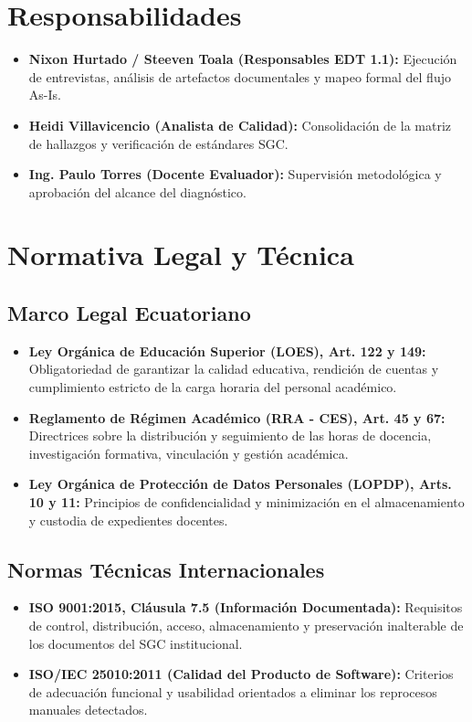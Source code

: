 \documentclass[12pt,a4paper]{article}
\begin{document}
\section{Responsabilidades}
\begin{itemize}[leftmargin=1.5em, itemsep=2pt]
    \item \textbf{Nixon Hurtado / Steeven Toala (Responsables EDT 1.1):} Ejecución de entrevistas, análisis de artefactos documentales y mapeo formal del flujo As-Is.
    \item \textbf{Heidi Villavicencio (Analista de Calidad):} Consolidación de la matriz de hallazgos y verificación de estándares SGC.
    \item \textbf{Ing. Paulo Torres (Docente Evaluador):} Supervisión metodológica y aprobación del alcance del diagnóstico.
\end{itemize}

\section{Normativa Legal y Técnica}
\subsection{Marco Legal Ecuatoriano}
\begin{itemize}[leftmargin=1.5em, itemsep=2pt]
    \item \textbf{Ley Orgánica de Educación Superior (LOES), Art. 122 y 149:} Obligatoriedad de garantizar la calidad educativa, rendición de cuentas y cumplimiento estricto de la carga horaria del personal académico.
    \item \textbf{Reglamento de Régimen Académico (RRA - CES), Art. 45 y 67:} Directrices sobre la distribución y seguimiento de las horas de docencia, investigación formativa, vinculación y gestión académica.
    \item \textbf{Ley Orgánica de Protección de Datos Personales (LOPDP), Arts. 10 y 11:} Principios de confidencialidad y minimización en el almacenamiento y custodia de expedientes docentes.
\end{itemize}
\subsection{Normas Técnicas Internacionales}
\begin{itemize}[leftmargin=1.5em, itemsep=2pt]
    \item \textbf{ISO 9001:2015, Cláusula 7.5 (Información Documentada):} Requisitos de control, distribución, acceso, almacenamiento y preservación inalterable de los documentos del SGC institucional.
    \item \textbf{ISO/IEC 25010:2011 (Calidad del Producto de Software):} Criterios de adecuación funcional y usabilidad orientados a eliminar los reprocesos manuales detectados.
\end{itemize}
\end{document}
